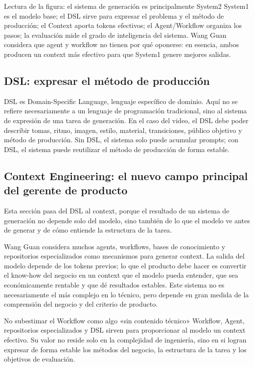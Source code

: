 \documentclass[a4paper]{article}
\begin{document}
\begin{knowledgebox}{Lectura de la figura: el sistema de generación es principalmente System2}
System1 es el modelo base; el DSL sirve para expresar el problema y el método de producción; el Context aporta tokens efectivos; el Agent/Workflow organiza los pasos; la evaluación mide el grado de inteligencia del sistema. Wang Guan considera que agent y workflow no tienen por qué oponerse: en esencia, ambos producen un context más efectivo para que System1 genere mejores salidas.
\end{knowledgebox}

\subsection{DSL: expresar el método de producción}

DSL es Domain-Specific Language, lenguaje específico de dominio. Aquí no se refiere necesariamente a un lenguaje de programación tradicional, sino al sistema de expresión de una tarea de generación. En el caso del video, el DSL debe poder describir tomas, ritmo, imagen, estilo, material, transiciones, público objetivo y método de producción. Sin DSL, el sistema solo puede acumular prompts; con DSL, el sistema puede reutilizar el método de producción de forma estable.

\subsection{Context Engineering: el nuevo campo principal del gerente de producto}

Esta sección pasa del DSL al context, porque el resultado de un sistema de generación no depende solo del modelo, sino también de lo que el modelo ve antes de generar y de cómo entiende la estructura de la tarea.

Wang Guan considera muchos agents, workflows, bases de conocimiento y repositorios especializados como mecanismos para generar context. La salida del modelo depende de los tokens previos; lo que el producto debe hacer es convertir el know-how del negocio en un context que el modelo pueda entender, que sea económicamente rentable y que dé resultados estables. Este sistema no es necesariamente el más complejo en lo técnico, pero depende en gran medida de la comprensión del negocio y del criterio de producto.

\begin{warningbox}{No subestimar el Workflow como algo «sin contenido técnico»}
Workflow, Agent, repositorios especializados y DSL sirven para proporcionar al modelo un context efectivo. Su valor no reside solo en la complejidad de ingeniería, sino en si logran expresar de forma estable los métodos del negocio, la estructura de la tarea y los objetivos de evaluación.
\end{warningbox}
\end{document}
